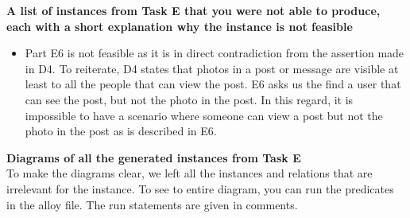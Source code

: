 \documentclass[pdftex,12pt,a4paper]{scrartcl}
\begin{document}
{\bf A list of instances from Task E that you were not able to produce, each with a short explanation why the instance is not feasible } 

\begin{itemize}
  \item Part E6 is not feasible as it is in direct contradiction from the assertion made in D4. To reiterate, D4 states that photos in a post or message are visible at least to all the people that can view the post. E6 asks us the find a user that can see the post, but not the photo in the post. In this regard, it is impossible to have a scenario where someone can view a post but not the photo in the post as is described in E6.
\end{itemize}

{\bf Diagrams of all the generated instances from Task E}\\

To make the diagrams clear, we left all the instances and relations that are irrelevant for the instance. To see to entire diagram, you can run the predicates in the alloy file. The run statements are given in comments.
\end{document}
